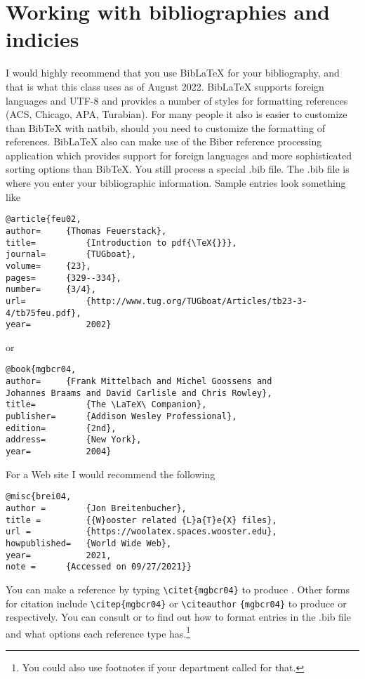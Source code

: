 \chapter{Working with bibliographies and indicies}\label{bibind}
I would highly recommend that you use Bib\LaTeX{} for your bibliography, and that is what this class uses as of August 2022. Bib\LaTeX{} supports foreign languages and UTF-8 and provides a number of styles for formatting references (ACS, Chicago, APA, Turabian). For many people it also is easier to customize than Bib\TeX{} with natbib, should you need to customize the formatting of references. Bib\LaTeX{} also can make use of the Biber reference processing application which provides support for foreign languages and more sophisticated sorting options than Bib\TeX{}. You still process a special .bib file. The .bib file is where you enter your bibliographic information. Sample entries look something like
\begin{singlespace}\small
\begin{verbatim}
@article{feu02,
author=		{Thomas Feuerstack},
title=			{Introduction to pdf{\TeX{}}}, 
journal=		{TUGboat}, 
volume=		{23},
pages=		{329--334},
number=		{3/4},
url=			{http://www.tug.org/TUGboat/Articles/tb23-3-4/tb75feu.pdf},
year=			2002}
\end{verbatim}
\end{singlespace}
or
\begin{singlespace}\small
\begin{verbatim}
@book{mgbcr04,
author=		{Frank Mittelbach and Michel Goossens and
Johannes Braams and David Carlisle and Chris Rowley},
title=			{The \LaTeX\ Companion},
publisher=		{Addison Wesley Professional},
edition=		{2nd},
address=		{New York},
year=			2004}
\end{verbatim}
\end{singlespace}

For a Web site I would recommend the following
\begin{singlespace}\small
\begin{verbatim}
@misc{brei04,
author = 		{Jon Breitenbucher},
title = 		{{W}ooster related {L}a{T}e{X} files},
url = 			{https://woolatex.spaces.wooster.edu},
howpublished=	{World Wide Web},
year=			2021,
note = 		{Accessed on 09/27/2021}}
\end{verbatim}
\end{singlespace}

You can make a reference by typing \verb|\citet{mgbcr04}| to produce \citet{mgbcr04}. Other forms for citation include \verb|\citep{mgbcr04}| or  \verb|\citeauthor| \verb|{mgbcr04}| to produce \citep{mgbcr04} or \citeauthor{mgbcr04} respectively. You can consult \citet{kd03} or \citet{mgbcr04} to find out how to format entries in the .bib file and what options each reference type has.\footnote{You could also use footnotes if your department called for that.}

